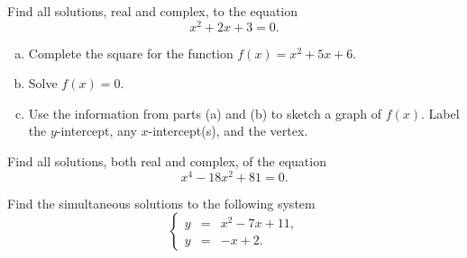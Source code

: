 \documentclass[12pt]{amsart}
\begin{document}
\newpage
\begin{thm}[18 Points]\label{ex9}
  Find all solutions, real and complex, to the equation
  $$x^2 + 2x + 3 = 0.$$
  \vspace{2in}
\end{thm}

\begin{thm}[18 Points]\label{ex10}
  \begin{enumerate}[(a)]
  \item
    Complete the square for the function $f(x) = x^2 + 5x + 6$.
    \vspace{1in}
  \item
    Solve $f(x) = 0$.
    \vspace{1in}
  \item
    Use the information from parts (a) and (b) to sketch a graph of $f(x)$.
    Label the $y$-intercept, any $x$-intercept(s), and the vertex.
    \vspace{2in}
  \end{enumerate}
\end{thm}

\newpage
\begin{thm}[18 Points]\label{ex9}
  Find all solutions, both real and complex, of the equation
  $$x^4 - 18x^2 + 81 = 0.$$
  \vspace{3in}
\end{thm}

\begin{thm}[18 Points]\label{ex9}
  Find the simultaneous solutions to the following system
  $$\left\{\begin{array}{rcl}
    y &=& x^2 - 7x + 11,\\
    y &=& -x + 2.
  \end{array}\right.$$
  \vspace{2in}
\end{thm}
\end{document}
